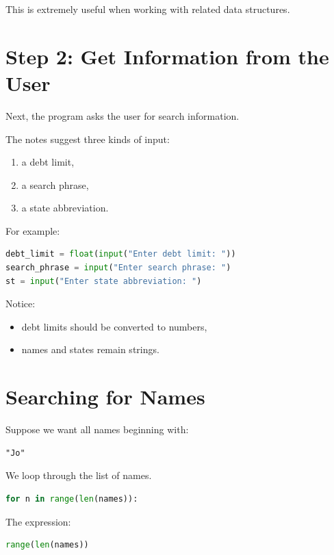 \documentclass[11pt]{article}
\begin{document}
This is extremely useful when working with related data structures.

\section{Step 2: Get Information from the User}

Next, the program asks the user for search information.

The notes suggest three kinds of input:

\begin{enumerate}
    \item a debt limit,
    \item a search phrase,
    \item a state abbreviation.
\end{enumerate}

For example:

\begin{lstlisting}[language=Python]
debt_limit = float(input("Enter debt limit: "))
search_phrase = input("Enter search phrase: ")
st = input("Enter state abbreviation: ")
\end{lstlisting}

Notice:

\begin{itemize}
    \item debt limits should be converted to numbers,
    \item names and states remain strings.
\end{itemize}

\section{Searching for Names}

Suppose we want all names beginning with:

\begin{lstlisting}
"Jo"
\end{lstlisting}

We loop through the list of names.

\begin{lstlisting}[language=Python]
for n in range(len(names)):
\end{lstlisting}

The expression:

\begin{lstlisting}[language=Python]
range(len(names))
\end{lstlisting}
\end{document}
